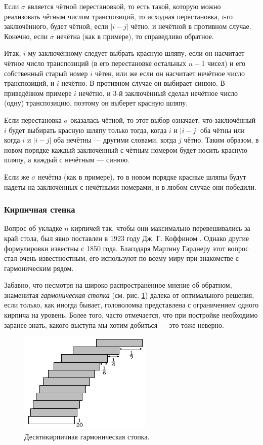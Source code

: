 Если $\sigma$ является чётной перестановкой, то есть такой, которую можно реализовать чётным числом транспозиций, то исходная перестановка, $i$-го заключённого, будет чётной, если $|i - j|$ чётно, и нечётной в противном случае.
Конечно, если $\sigma$ нечётна (как в примере), то справедливо обратное.

Итак, $i$-му заключённому следует выбрать красную шляпу, если он насчитает чётное число транспозиций (в его перестановке остальных $n - 1$ чисел) и его собственный старый номер $i$ чётен, или же если он насчитает нечётное число транспозиций, и $i$ нечётно.
В противном случае он выбирает синюю.
В приведённом примере $i$ нечётно, и $3$-й заключённый сделал нечётное число (одну) транспозицию, поэтому он выберет красную шляпу.

Если перестановка $\sigma$ оказалась чётной, то этот выбор означает, что заключённый $i$ будет выбирать красную шляпу только тогда, когда $i$ и $|i - j|$ оба чётны или когда $i$ и $|i - j|$ оба нечётны --- другими словами, когда $j$ чётно.
Таким образом, в новом порядке каждый заключённый с чётным номером будет носить красную шляпу, а каждый с нечётным --- синюю.

Если же $\sigma$ нечётна (как в примере), то в новом порядке красные шляпы будут надеты на заключённых с нечётными номерами, и в любом случае они победили.

\subsubsection*{Кирпичная стенка}

Вопрос об укладке $n$ кирпичей так, чтобы они максимально перевешивались за край стола, был явно поставлен в 1923 году Дж. Г. Коффином \cite{12}.
Однако другие формулировки известны с 1850 года.
Благодаря Мартину Гарднеру этот вопрос стал очень известностным, его используют по всему миру при знакомстве с гармоническим рядом.

Забавно, что несмотря на широко распространённое мнение об обратном, знаменитая \emph{гармоническая стопка} (см. рис. \ref{pic:kirpich1}) далека от оптимального решения, если только, как иногда бывает, головоломка представлена с ограничением одного кирпича на уровень.
Более того, часто отмечается, что при постройке необходимо заранее знать, 
какого выступа мы хотим добиться --- это тоже неверно.

\begin{figure}[ht!]
\centering
\includegraphics[scale=1]{pics/kirpich1}
\caption{Десятикирпичная гармоническая стопка.}
\label{pic:kirpich1}
\end{figure}


